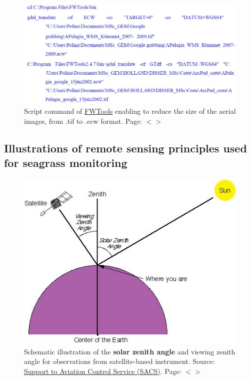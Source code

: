 \documentclass[11pt]{article}
\begin{document}
\begin{appendices}
\begin{figure}[H]
	\begin{center}
		\includegraphics[scale=0.4]{Script_Gdal.jpg}
		\caption{Script command of \href{http://fwtools.maptools.org/}{FWTools} enabling to reduce the size of the aerial images, from .tif to .ecw format. Page: $<$\pageref{gdal}$>$}\label{fig:A.2}
	\end{center}	
\end{figure}

\subsection{Illustrations of remote sensing principles used for seagrass monitoring}

\begin{figure}[H]
	\begin{center}
		\includegraphics[scale=0.65]{Zenith.jpg}
		\caption{Schematic illustration of the \textbf{solar zenith angle} and viewing zenith angle for observations from satellite-based instrument. Source: \href{http://sacs.aeronomie.be/}{Support to Aviation Control Service (SACS)}. Page: $<$\pageref{zenith}$>$}\label{fig:A.2-1}
	\end{center}
\end{figure}
\pagebreak


\end{appendices}
\end{document}
